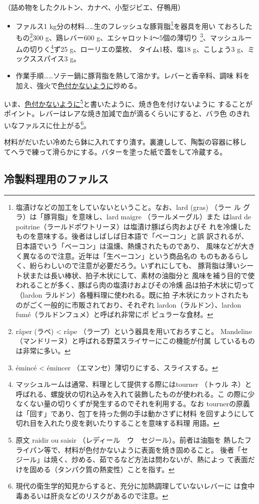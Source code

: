 \begin{recette}
（詰め物をしたクルトン、カナペ、小型ジビエ、仔鴨用）

\begin{itemize}
\item
  ファルス1 kg分の材料\ldots{}\ldots{}生のフレッシュな豚背脂\footnote{塩漬けなどの加工をしていないということ。なお、lard
    (gras) （ラー ル グラ）は「豚背脂」を意味し、lard maigre
    （ラールメーグル）また はlard de
    poitrine（ラールドポワトリーヌ）は塩漬け豚ばら肉およびそ
    れを冷燻したものを意味する。後者はしばしば日本語で「ベーコン」と誤
    訳されるが、日本語でいう「ベーコン」は温燻、熱燻されたものであり、
    風味などが大きく異なるので注意。近年は「生ベーコン」という商品名の
    ものもあるらしく、紛らわしいので注意が必要だろう。いずれにしても、
    豚背脂は薄いシート状または長い棒状、拍子木状にして、素材の油脂分と
    風味を補う目的で使われることが多く、豚ばら肉の塩漬けおよびその冷燻
    品は拍子木状に切って（lardon ラルドン）各種料理に使われる。既に拍
    子木状にカットされたものがごく一般的に市販されており、それぞれ
    lardon（ラルドン）、lardon fumé（ラルドンフュメ）と呼ばれ非常にポ
    ピュラーな食材。}を器具を用い ておろしたもの\footnote{râper (ラペ)
    \textless{} râpe （ラープ）という器具を用いておろすこと。 Mandeline
    （マンドリーヌ）と呼ばれる野菜スライサーにこの機能が付属
    しているものは非常に多い。}300 g、鶏レバー600
  g、エシャロット4〜5個の薄切り \footnote{émincé \textless{} émincer
    （エマンセ）薄切りにする、スライスする。}、マッシュルームの切りく\footnote{マッシュルームは通常、料理として提供する際にはtourner
    （トゥル
    ネ）と呼ばれる、螺旋状の切れ込みを入れて装飾したものが使われる。こ
    の際に少なくない量の切りくずが発生するのでそれを利用する。なお
    tournerの原義は「回す」であり、包丁を持った側の手は動かさずに材料
    を回すようにして切れ目を入れたり皮を剥いたりすることを意味する料理
    用語。}ず25 g、ローリエの葉\undemi{}枚、 タイム1枝、塩18
  g、こしょう3 g、ミックススパイス3 g。
\item
  作業手順\ldots{}\ldots{}ソテー鍋に豚背脂を熱して溶かす。レバーと香辛料、調味
  料を加え、強火で\ul{色付かないように}炒める。
\end{itemize}

いま、\ul{色付かないように}\footnote{原文 raidir ou saisir
  （レディール　ウ　セジール）。前者は油脂を
  熱したフライパン等で、材料が色付かないように表面を焼き固めること。
  後者「セジール」は焼く、炒める、茹でるなど方法は問わないが、熱によっ
  て表面だけを固める（タンパク質の熱変性）ことを指す。}と書いたように、焼き色を付けないように
することがポイント。レバーはレアな焼き加減で血が滴るくらいにすると、バラ色
のきれいなファルスに仕上がる\footnote{現代の衛生学的知見からすると、充分に加熱調理していないレバーに
  は食中毒あるいは肝炎などのリスクがあるので注意。}。

材料がだいたい冷めたら鉢に入れてすり潰す。裏漉しして、陶製の容器に移し
てヘラで練って滑らかにする。バターを塗った紙で蓋をして冷蔵する。
\end{recette}
\hypertarget{farce-pour-les-pieces-froides}{%
\subsection{冷製料理用のファルス}\label{farce-pour-les-pieces-froides}}

